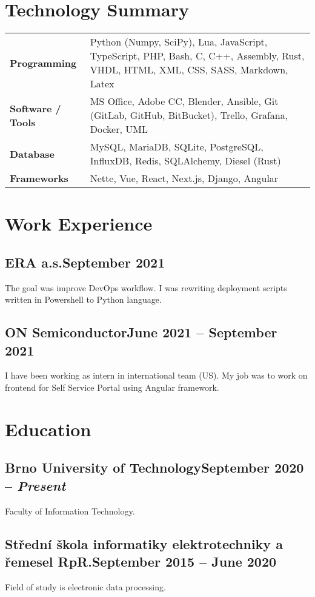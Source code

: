\documentclass{article}
\newcommand{\dsubsection}[2]{
    \subsection{\textbf{\large{#1}}\hfill\textmd{\small{#2}}}
}
\begin{document}
\section{Technology Summary}

{\renewcommand{\arraystretch}{1.5}%
\begin{tabularx}{\textwidth}{ >{\bfseries}l X }
    Programming       & Python (Numpy, SciPy), Lua, JavaScript, TypeScript, PHP, Bash, C, C++, Assembly, Rust, VHDL, HTML, XML, CSS, SASS, Markdown, Latex \\
    Software / Tools  & MS Office, Adobe CC, Blender, Ansible, Git (GitLab, GitHub, BitBucket), Trello, Grafana, Docker, UML \\
    Database          & MySQL, MariaDB, SQLite, PostgreSQL, InfluxDB, Redis, SQLAlchemy, Diesel (Rust) \\
    Frameworks        & Nette, Vue, React, Next.js, Django, Angular \\
\end{tabularx}}


\section{Work Experience}

\dsubsection{ERA a.s.}{September 2021}

The goal was improve DevOps workflow. I was rewriting deployment scripts written in Powershell to Python language.

\dsubsection{ON Semiconductor}{June 2021 -- September 2021}

I have been working as intern in international team (US). My job was to work on frontend for Self Service Portal using Angular framework.


\section{Education}

\dsubsection{Brno University of Technology}{September 2020 -- \textit{Present}}

Faculty of Information Technology.

\dsubsection{Střední škola informatiky elektrotechniky a řemesel RpR.}{September 2015 -- June 2020}

Field of study is electronic data processing.
\end{document}
